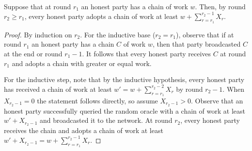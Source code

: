 \begin{lemma}
  Suppose that at round $r_1$ an honest party has a chain of work $w$.
  Then, by round $r_2 \geq r_1$, every honest party adopts a chain of work at least
  $w + \sum_{r = r_1}^{r_2 - 1}{X_r}$.
\end{lemma}
\begin{proof}
  By induction on $r_2$. For the inductive base ($r_2 = r_1$), observe that
  if at round $r_1$ an honest party has a chain $C$ of work $w$, then
  that party broadcasted $C$ at the end or round $r_1 - 1$. It follows that
  every honest party receives $C$ at round $r_1$ and adopts a chain with
  greater or equal work.

  For the inductive step, note that by the inductive hypothesis,
  every honest party has received a chain of work at least $w' = w + \sum_{r = r_1}^{r_2 - 2}{X_r}$
  by round $r_2 - 1$. When $X_{r_2 - 1} = 0$ the statement follows directly, so assume
  $X_{r_2 - 1} > 0$. Observe that an honest party successfully queried the random oracle
  with a chain of work at least $w' + X_{r_2 - 1}$ and broadcasted it to the network.
  At round $r_2$, every honest party receives the chain and adopts a chain
  of work at least $w' + X_{r_2 - 1} = w + \sum_{r = r_1}^{r_2 - 1}{X_r}$. \Qed
\end{proof}

